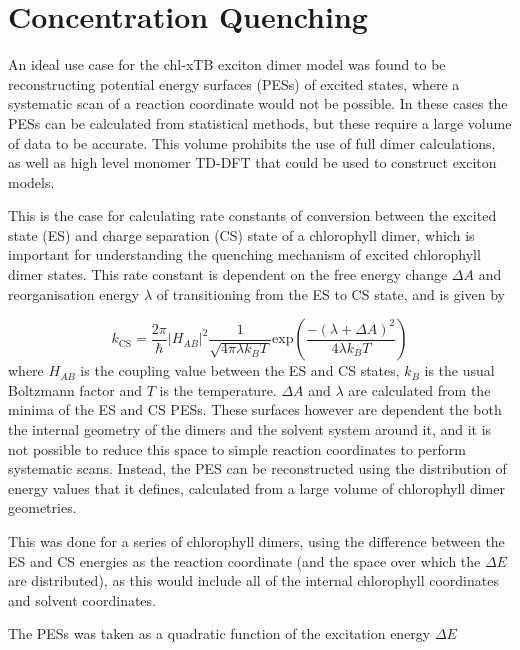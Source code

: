 \afterpartskip
\section{Concentration Quenching}
\label{sec:concentration_quenching}

An ideal use case for the chl-xTB exciton dimer model was found to be reconstructing
potential energy surfaces (PESs) of excited states, where a systematic scan of a
reaction coordinate would not be possible. In these cases the PESs can be calculated
from statistical methods, but these require a large volume of data to be accurate.
This volume prohibits the use of full dimer calculations, as well as high level
monomer TD-DFT that could be used to construct exciton models.

This is the case for calculating rate constants of conversion between the excited 
state (ES) and charge separation (CS) state of a chlorophyll dimer, which is important
for understanding the quenching mechanism of excited chlorophyll dimer states. This
rate constant is dependent on the free energy change $\Delta A$ and reorganisation
energy $\lambda$ of transitioning from the ES to CS state, and is given by

\begin{equation}
    k_{\text{CS}} = \frac{2\pi}{\hbar} \left\lvert H_{AB} \right\rvert^2 \frac{1}{\sqrt{4 \pi \lambda k_B T}}\text{exp}\left(\frac{-\left(\lambda + \Delta A\right)^2}{4 \lambda k_B T}\right)
\end{equation}
%
where $H_{AB}$ is the coupling value between the ES and CS states, $k_B$ is the 
usual Boltzmann factor and $T$ is the temperature. $\Delta A$ and $\lambda$ are
calculated from the minima of the ES and CS PESs. These surfaces however are 
dependent the both the internal geometry of the dimers and the solvent system around
it, and it is not possible to reduce this space to simple reaction coordinates to 
perform systematic scans. Instead, the PES can be reconstructed using the distribution 
of energy values that it defines, calculated from a large volume of chlorophyll 
dimer geometries.

This was done for a series of chlorophyll dimers, using the difference between the
ES and CS energies as the reaction coordinate (and the space over which the $\Delta E$
are  distributed), as this would include all of the internal chlorophyll coordinates 
and solvent coordinates.

The PESs was taken as a quadratic function of the excitation energy $\Delta E$

